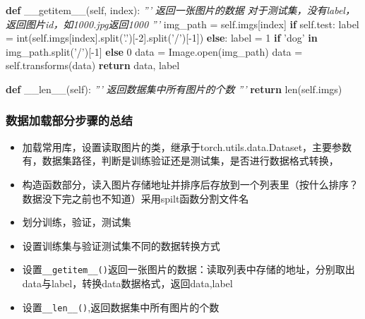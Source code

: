 \documentclass[11pt]{article}
\providecommand{\tightlist}{%
      \setlength{\itemsep}{0pt}\setlength{\parskip}{0pt}}
\newenvironment{Shaded}{}{}
\newcommand{\KeywordTok}[1]{\textcolor[rgb]{0.00,0.44,0.13}{\textbf{{#1}}}}
\newcommand{\DecValTok}[1]{\textcolor[rgb]{0.25,0.63,0.44}{{#1}}}
\newcommand{\StringTok}[1]{\textcolor[rgb]{0.25,0.44,0.63}{{#1}}}
\newcommand{\CommentTok}[1]{\textcolor[rgb]{0.38,0.63,0.69}{\textit{{#1}}}}
\newcommand{\FunctionTok}[1]{\textcolor[rgb]{0.02,0.16,0.49}{{#1}}}
\newcommand{\NormalTok}[1]{{#1}}
\newcommand{\VariableTok}[1]{\textcolor[rgb]{0.10,0.09,0.49}{{#1}}}
\newcommand{\ControlFlowTok}[1]{\textcolor[rgb]{0.00,0.44,0.13}{\textbf{{#1}}}}
\newcommand{\OperatorTok}[1]{\textcolor[rgb]{0.40,0.40,0.40}{{#1}}}
\newcommand{\BuiltInTok}[1]{{#1}}
\begin{document}
\begin{Shaded}
\begin{Highlighting}[]
        
    \KeywordTok{def} \FunctionTok{__getitem__}\NormalTok{(}\VariableTok{self}\NormalTok{, index):}
        \CommentTok{'''}
\CommentTok{        返回一张图片的数据}
\CommentTok{        对于测试集，没有label，返回图片id，如1000.jpg返回1000}
\CommentTok{        '''}
\NormalTok{        img_path }\OperatorTok{=} \VariableTok{self}\NormalTok{.imgs[index]}
        \ControlFlowTok{if} \VariableTok{self}\NormalTok{.test: }
\NormalTok{             label }\OperatorTok{=} \BuiltInTok{int}\NormalTok{(}\VariableTok{self}\NormalTok{.imgs[index].split(}\StringTok{'.'}\NormalTok{)[}\OperatorTok{-}\DecValTok{2}\NormalTok{].split(}\StringTok{'/'}\NormalTok{)[}\OperatorTok{-}\DecValTok{1}\NormalTok{])}
        \ControlFlowTok{else}\NormalTok{: }
\NormalTok{             label }\OperatorTok{=} \DecValTok{1} \ControlFlowTok{if} \StringTok{'dog'} \KeywordTok{in}\NormalTok{ img_path.split(}\StringTok{'/'}\NormalTok{)[}\OperatorTok{-}\DecValTok{1}\NormalTok{] }\ControlFlowTok{else} \DecValTok{0}
\NormalTok{        data }\OperatorTok{=}\NormalTok{ Image.}\BuiltInTok{open}\NormalTok{(img_path)}
\NormalTok{        data }\OperatorTok{=} \VariableTok{self}\NormalTok{.transforms(data)}
        \ControlFlowTok{return}\NormalTok{ data, label}
    
    \KeywordTok{def} \FunctionTok{__len__}\NormalTok{(}\VariableTok{self}\NormalTok{):}
        \CommentTok{'''}
\CommentTok{        返回数据集中所有图片的个数}
\CommentTok{        '''}
        \ControlFlowTok{return} \BuiltInTok{len}\NormalTok{(}\VariableTok{self}\NormalTok{.imgs)}
\end{Highlighting}
\end{Shaded}

    \subsubsection{数据加载部分步骤的总结}\label{ux6570ux636eux52a0ux8f7dux90e8ux5206ux6b65ux9aa4ux7684ux603bux7ed3}

\begin{itemize}
\tightlist
\item
  加载常用库，设置读取图片的类，继承于torch.utils.data.Dataset，主要参数有，数据集路径，判断是训练验证还是测试集，是否进行数据格式转换，
\item
  构造函数部分，读入图片存储地址并排序后存放到一个列表里（按什么排序？数据没下完之前也不知道）采用spilt函数分割文件名
\item
  划分训练，验证，测试集
\item
  设置训练集与验证测试集不同的数据转换方式
\item
  设置\texttt{\_\_getitem\_\_()}返回一张图片的数据：读取列表中存储的地址，分别取出data与label，转换data数据格式，返回data,label
\item
  设置\texttt{\_\_len\_\_()},返回数据集中所有图片的个数
\end{itemize}
\end{document}
